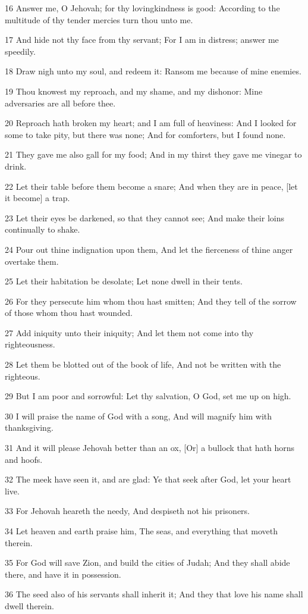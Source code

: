 \par 16 Answer me, O Jehovah; for thy lovingkindness is good: According to the multitude of thy tender mercies turn thou unto me.
\par 17 And hide not thy face from thy servant; For I am in distress; answer me speedily.
\par 18 Draw nigh unto my soul, and redeem it: Ransom me because of mine enemies.
\par 19 Thou knowest my reproach, and my shame, and my dishonor: Mine adversaries are all before thee.
\par 20 Reproach hath broken my heart; and I am full of heaviness: And I looked for some to take pity, but there was none; And for comforters, but I found none.
\par 21 They gave me also gall for my food; And in my thirst they gave me vinegar to drink.
\par 22 Let their table before them become a snare; And when they are in peace, [let it become] a trap.
\par 23 Let their eyes be darkened, so that they cannot see; And make their loins continually to shake.
\par 24 Pour out thine indignation upon them, And let the fierceness of thine anger overtake them.
\par 25 Let their habitation be desolate; Let none dwell in their tents.
\par 26 For they persecute him whom thou hast smitten; And they tell of the sorrow of those whom thou hast wounded.
\par 27 Add iniquity unto their iniquity; And let them not come into thy righteousness.
\par 28 Let them be blotted out of the book of life, And not be written with the righteous.
\par 29 But I am poor and sorrowful: Let thy salvation, O God, set me up on high.
\par 30 I will praise the name of God with a song, And will magnify him with thanksgiving.
\par 31 And it will please Jehovah better than an ox, [Or] a bullock that hath horns and hoofs.
\par 32 The meek have seen it, and are glad: Ye that seek after God, let your heart live.
\par 33 For Jehovah heareth the needy, And despiseth not his prisoners.
\par 34 Let heaven and earth praise him, The seas, and everything that moveth therein.
\par 35 For God will save Zion, and build the cities of Judah; And they shall abide there, and have it in possession.
\par 36 The seed also of his servants shall inherit it; And they that love his name shall dwell therein.


